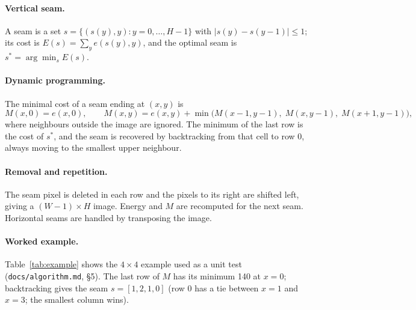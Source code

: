 \documentclass[11pt,a4paper]{article}
\begin{document}
\paragraph{Vertical seam.} A seam is a set $s=\{(s(y),y) : y=0,\dots,H-1\}$ with $|s(y)-s(y-1)|\le 1$;
its cost is $E(s)=\sum_y e(s(y),y)$, and the optimal seam is $s^*=\arg\min_s E(s)$.

\paragraph{Dynamic programming.} The minimal cost of a seam ending at $(x,y)$ is
\[
  M(x,0)=e(x,0),\qquad
  M(x,y)=e(x,y)+\min\bigl(M(x-1,y-1),\;M(x,y-1),\;M(x+1,y-1)\bigr),
\]
where neighbours outside the image are ignored. The minimum of the last row is the cost of $s^*$, and the
seam is recovered by backtracking from that cell to row 0, always moving to the smallest upper neighbour.

\paragraph{Removal and repetition.} The seam pixel is deleted in each row and the pixels to its right are
shifted left, giving a $(W-1)\times H$ image. Energy and $M$ are recomputed for the next seam. Horizontal
seams are handled by transposing the image.

\paragraph{Worked example.} Table~\ref{tab:example} shows the $4\times4$ example used as a unit test
(\texttt{docs/algorithm.md}, \S5). The last row of $M$ has its minimum 140 at $x=0$; backtracking gives the
seam $s=[1,2,1,0]$ (row 0 has a tie between $x=1$ and $x=3$; the smallest column wins).
\end{document}
